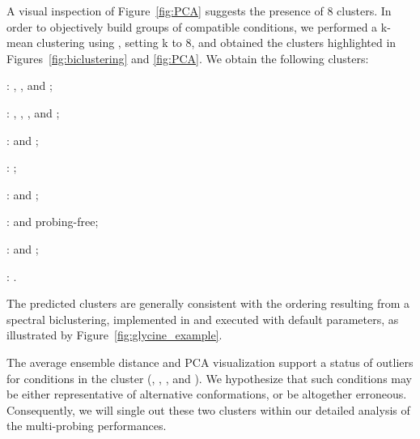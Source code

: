 \documentclass[a4,center,fleqn]{NAR}
\begin{document}
A visual inspection of Figure~\ref{fig:PCA} suggests the presence of 8 clusters. In order to objectively build groups of compatible conditions, we performed a k-mean clustering using , setting k to 8, and obtained the clusters highlighted in Figures~\ref{fig:biclustering} and \ref{fig:PCA}.  We obtain the following clusters:
\begin{bulletlist}%
\item {}: \OneMSevILU, \NMIA, and \NMIAMg;
\item {}: \OneMSevCE, \NMIACE, \BzCN, and \NAICE;
\item {}: \OneMSevILUThreeMg and \OneMSevILUMg;
\item {}: \OneMSevILUThree;
\item {}: \NMIAMgCE and \OneMSevMgCE;
\item {}: \DMSMg and probing-free;
\item {}: \CMCTMg and \NAIMg;
\item {}: \BzCNMg.
\end{bulletlist}
The predicted clusters are generally consistent with the ordering resulting from a spectral biclustering, implemented in  and executed with default parameters, as illustrated by Figure~\ref{fig:glycine_example}. 

The average ensemble distance and PCA visualization support a status of outliers for conditions in the cluster  (\OneMSevCE, \NMIACE, \BzCN, and \NAICE).  We hypothesize that such conditions may be either representative of alternative conformations, or be altogether erroneous. Consequently, we will single out these two clusters within our detailed analysis of the multi-probing performances.

\end{document}
